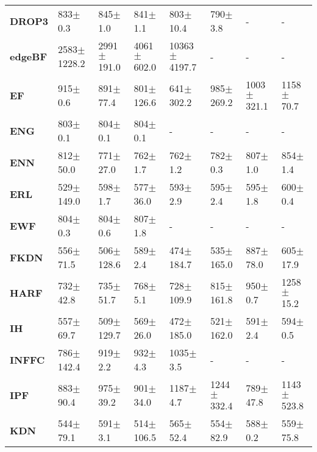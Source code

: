 \begin{tabular}{llllllll}
\textbf{DROP3           } &      833$\pm$ 0.3 &     845$\pm$ 1.0 &     841$\pm$ 1.1 &      803$\pm$ 10.4 &     790$\pm$ 3.8 &                - &                - \\
\textbf{edgeBF          } &  2583$\pm$ 1228.2 &  2991$\pm$ 191.0 &  4061$\pm$ 602.0 &  10363$\pm$ 4197.7 &                - &                - &                - \\
\textbf{EF              } &      915$\pm$ 0.6 &    891$\pm$ 77.4 &   801$\pm$ 126.6 &     641$\pm$ 302.2 &   985$\pm$ 269.2 &  1003$\pm$ 321.1 &   1158$\pm$ 70.7 \\
\textbf{ENG             } &      803$\pm$ 0.1 &     804$\pm$ 0.1 &     804$\pm$ 0.1 &                  - &                - &                - &                - \\
\textbf{ENN             } &     812$\pm$ 50.0 &    771$\pm$ 27.0 &     762$\pm$ 1.7 &       762$\pm$ 1.2 &     782$\pm$ 0.3 &     807$\pm$ 1.0 &     854$\pm$ 1.4 \\
\textbf{ERL             } &    529$\pm$ 149.0 &     598$\pm$ 1.7 &    577$\pm$ 36.0 &       593$\pm$ 2.9 &     595$\pm$ 2.4 &     595$\pm$ 1.8 &     600$\pm$ 0.4 \\
\textbf{EWF             } &      804$\pm$ 0.3 &     804$\pm$ 0.6 &     807$\pm$ 1.8 &                  - &                - &                - &                - \\
\textbf{FKDN            } &     556$\pm$ 71.5 &   506$\pm$ 128.6 &     589$\pm$ 2.4 &     474$\pm$ 184.7 &   535$\pm$ 165.0 &    887$\pm$ 78.0 &    605$\pm$ 17.9 \\
\textbf{HARF            } &     732$\pm$ 42.8 &    735$\pm$ 51.7 &     768$\pm$ 5.1 &     728$\pm$ 109.9 &   815$\pm$ 161.8 &     950$\pm$ 0.7 &   1258$\pm$ 15.2 \\
\textbf{IH              } &     557$\pm$ 69.7 &   509$\pm$ 129.7 &    569$\pm$ 26.0 &     472$\pm$ 185.0 &   521$\pm$ 162.0 &     591$\pm$ 2.4 &     594$\pm$ 0.5 \\
\textbf{INFFC           } &    786$\pm$ 142.4 &     919$\pm$ 2.2 &     932$\pm$ 4.3 &      1035$\pm$ 3.5 &                - &                - &                - \\
\textbf{IPF             } &     883$\pm$ 90.4 &    975$\pm$ 39.2 &    901$\pm$ 34.0 &      1187$\pm$ 4.7 &  1244$\pm$ 332.4 &    789$\pm$ 47.8 &  1143$\pm$ 523.8 \\
\textbf{KDN             } &     544$\pm$ 79.1 &     591$\pm$ 3.1 &   514$\pm$ 106.5 &      565$\pm$ 52.4 &    554$\pm$ 82.9 &     588$\pm$ 0.2 &    559$\pm$ 75.8 \\

\end{tabular}
